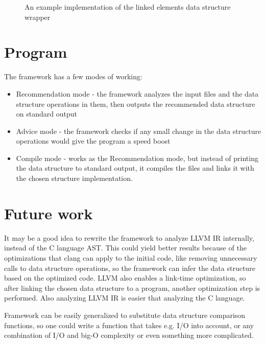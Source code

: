 \documentclass[a4paper,11pt]{article}
\begin{document}
			\begin{figure}
				

				\caption{An example implementation of the linked elements data structure wrapper}

				\label{fig:linked-cache}
			\end{figure}

\section{Program}

	The framework has a few modes of working:
	\begin{itemize}
		\item Recommendation mode - the framework analyzes the input files and the data structure operations in
			them, then outputs the recommended data structure on standard output
		\item Advice mode - the framework checks if any small change in the data structure operations would give
			the program a speed boost
		\item Compile mode - works as the Recommendation mode, but instead of printing the data structure to
			standard output, it compiles the files and links it with the chosen structure implementation.
	\end{itemize}

\section{Future work} \label{sec:future}
	It may be a good idea to rewrite the framework to analyze LLVM\cite{LLVM} IR internally, instead of the C
	language AST. This could yield better results because of the optimizations that clang\cite{Clang} can apply to
	the initial code, like removing unnecessary calls to data structure operations, so the framework can infer the
	data structure based on the optimized code. LLVM also enables a link-time optimization, so after linking the
	chosen data structure to a program, another optimization step is performed. Also analyzing LLVM IR is easier
	that analyzing the C language.

    Framework can be easily generalized to substitute data structure comparison functions, so one could write a function
    that takes e.g. I/O into account, or any combination of I/O and big-O complexity or even something more complicated.
\end{document}
